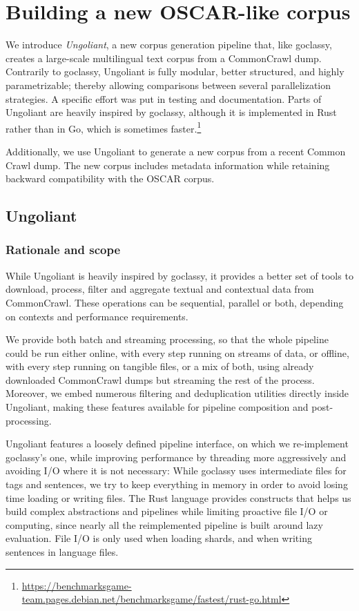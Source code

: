 \section{Building a new OSCAR-like corpus}

We introduce \emph{Ungoliant}, a new corpus generation pipeline that, like goclassy, creates a large-scale multilingual text corpus from a CommonCrawl dump. Contrarily to goclassy, Ungoliant is fully modular, better structured, and highly parametrizable; thereby allowing comparisons between several parallelization strategies. A specific effort was put in testing and documentation. Parts of Ungoliant are heavily inspired by goclassy, although it is implemented in Rust rather than in Go, which is sometimes faster.\footnote{\url{https://benchmarksgame-team.pages.debian.net/benchmarksgame/fastest/rust-go.html}}

Additionally, we use Ungoliant to generate a new corpus from a recent Common Crawl dump. The new corpus includes metadata information while retaining backward compatibility with the OSCAR corpus.


\subsection{Ungoliant}

\subsubsection{Rationale and scope}
\label{subsubsec:rationale}
While Ungoliant is heavily inspired by goclassy, it provides a better set of tools to download, process, filter and aggregate textual and contextual data from CommonCrawl. These operations can be sequential, parallel or both, depending on contexts and performance requirements.

We provide both batch and streaming processing, so that the whole pipeline could be run either online, with every step running on streams of data, or offline, with every step running on tangible files, or a mix of both, using already downloaded CommonCrawl dumps but streaming the rest of the process. Moreover, we embed numerous filtering and deduplication utilities directly inside Ungoliant, making these features available for pipeline composition and post-processing.

Ungoliant features a loosely defined pipeline interface, on which we re-implement goclassy's one, while improving performance by threading more aggressively and avoiding I/O where it is not necessary: While goclassy uses intermediate files for tags and sentences, we try to keep everything in memory in order to avoid losing time loading or writing files. The Rust language provides constructs that helps us build complex abstractions and pipelines while limiting proactive file I/O or computing, since nearly all the reimplemented pipeline is built around lazy evaluation. File I/O is only used when loading shards, and when writing sentences in language files.

